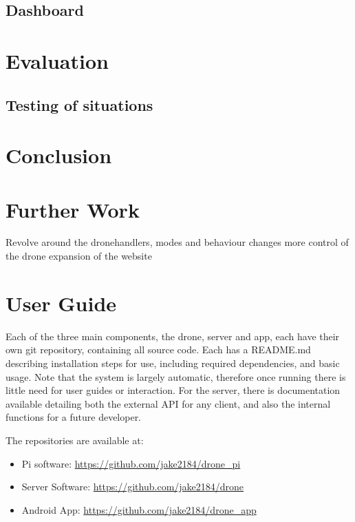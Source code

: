 \documentclass{article}
\begin{document}
\subsection{Dashboard}

\section{Evaluation}

\subsection{Testing of situations}






\section{Conclusion}



\section{Further Work}
 Revolve around the dronehandlers, modes and behaviour changes
 more control of the drone
 expansion of the website

\section{User Guide}\label{UserGuide}
Each of the three main components, the drone, server and app, each have their own git repository, containing all source code. Each has a README.md describing installation steps for use, including required dependencies, and basic usage. Note that the system is largely automatic, therefore once running there is little need for user guides or interaction. For the server, there is documentation available detailing both the external API for any client, and also the internal functions for a future developer. 

The repositories are available at: 
\begin{itemize}
	\item Pi software: \url{https://github.com/jake2184/drone_pi}
	\item Server Software: \url{https://github.com/jake2184/drone}
	\item Android App: \url{https://github.com/jake2184/drone_app}
\end{itemize}
\end{document}
